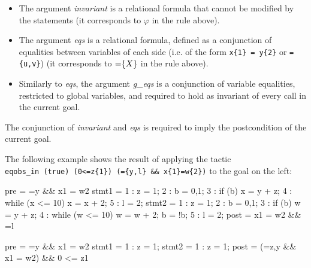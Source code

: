\begin{itemize}
\item The argument \textit{invariant} is a relational formula that
  cannot be modified by the statements (it corresponds to $\varphi$ in
  the rule above).
\item The argument \textit{eqs} is a relational formula, defined as a
  conjunction of equalities between variables of each side (i.e. of
  the form \verb+x{1} = y{2}+ or \verb+={u,v}+) (it corresponds to
  ${=}{\left\{X\right\}}$ in the rule above).
\item Similarly to \textit{eqs}, the argument \textit{g_eqs} is a
  conjunction of variable equalities, restricted to global variables,
  and required to hold as invariant of every call in the current goal.
\end{itemize}
%
The conjunction of \textit{invariant} and \textit{eqs} is
required to imply the postcondition of the current goal.

\Example The following example shows the result of applying the tactic
\\
\noindent
\verb+eqobs_in (true) (0<=z{1}) (={y,l} && x{1}=w{2})+ to the goal on
the left:

\begin{minicode}{0.5}

pre   = ={y} && x{1} = w{2}
stmt1 =   1 : z = 1;
          2 : b = {0,1};
          3 : if (b) x = y + z;
          4 : while (x <= 10) x = x + 2;
          5 : l = 2;
stmt2 =   1 : z = 1;
          2 : b = {0,1};
          3 : if (b) w = y + z;
          4 : while (w <= 10) {
                w = w + 2;
                b = !b;
              }
          5 : l = 2;
post  = x{1} = w{2} && ={l}

\end{minicode}
\begin{minicode}{0.5}
pre   = ={y} && x{1} = w{2}
stmt1 =   1 : z = 1;
stmt2 =   1 : z = 1;
post  = (={z,y} && x{1} = w{2}) && 0 <= z{1}
\end{minicode}

